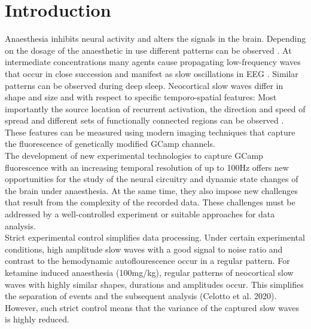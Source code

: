 
\chapter{Introduction} %

\label{Chapter1} %
\newcommand{\keyword}[1]{\textbf{#1}}
\newcommand{\tabhead}[1]{\textbf{#1}}
\newcommand{\code}[1]{\texttt{#1}}
\newcommand{\file}[1]{\texttt{\bfseries#1}}
\newcommand{\option}[1]{\texttt{\itshape#1}}
Anaesthesia inhibits neural activity and alters the signals in the brain. Depending on the dosage of the anaesthetic in use different patterns can be observed \parencite{eger1981isoflurane}. At intermediate concentrations many agents cause propagating low-frequency waves that occur in close succession and manifest as slow oscillations in EEG \parencite{brown2012control, eger1981isoflurane}. Similar patterns can be observed during deep sleep. Neocortical slow waves differ in shape and size and with respect to specific temporo-spatial features: Most importantly the source location of recurrent activation, the direction and speed of spread and different sets of functionally connected regions can be observed \parencite{brown2012control}. These features can be measured using modern imaging techniques that capture the fluorescence of genetically modified GCamp channels.\\
The development of new experimental technologies to capture GCamp fluorescence with an increasing temporal resolution of up to 100Hz offers new opportunities for the study of the neural circuitry and dynamic state changes of the brain under anaesthesia. At the same time, they also impose new challenges that result from the complexity of the recorded data. These challenges must be addressed by a well-controlled experiment or suitable approaches for data analysis.\\
Strict experimental control simplifies data processing. Under certain experimental conditions, high amplitude slow waves with a good signal to noise ratio and contrast to the hemodynamic autoflourescence occur in a regular pattern. For ketamine induced anaesthesia (100mg/kg), regular patterns of neocortical slow waves with highly similar shapes, durations and amplitudes occur. This simplifies the separation of events and the subsequent analysis (Celotto et al. 2020). However, such strict control means that the variance of the captured slow waves is highly reduced.\\

